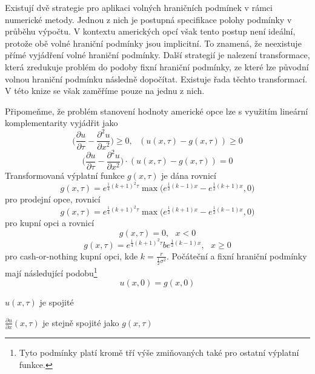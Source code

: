 \documentclass[a4paper]{book}
\begin{document}
Existují dvě strategie pro aplikaci volných hraničních podmínek v rámci numerické metody. Jednou z nich je postupná specifikace polohy podmínky v průběhu výpočtu. V kontextu amerických opcí však tento postup není ideální, protože obě volné hraniční podmínky jsou implicitní. To znamená, že neexistuje přímé vyjádření volné hraniční podmínky. Další strategií je nalezení transformace, která zredukuje problém do podoby fixní hraniční podmínky, ze které lze původní volnou hraniční podmínku následně dopočítat. Existuje řada těchto transformací. V této knize se však zaměříme pouze na jednu z nich.

Připomeňme, že problém stanovení hodnoty americké opce lze s využitím lineární komplementarity vyjádřit jako
\begin{equation*}
\Bigg( \frac{\partial u}{\partial \tau} - \frac{\partial^2 u}{\partial x^2} \Bigg) \ge 0,~~~(u(x, \tau) - g(x,\tau)) \ge 0
\end{equation*}
\begin{equation}
\Bigg( \frac{\partial u}{\partial \tau} - \frac{\partial^2 u}{\partial x^2} \Bigg) \cdot (u(x, \tau) - g(x,\tau)) = 0
\end{equation}
Transformovaná výplatní funkce $g(x, \tau)$ je dána rovnicí
\begin{equation*}
g(x, \tau) = e^{\frac{1}{4}(k+1)^2 \tau}\max\Big( e^{\frac{1}{2}(k-1)x} - e^{\frac{1}{2}(k+1)x}, 0 \Big)
\end{equation*}
pro prodejní opce, rovnicí
\begin{equation*}
g(x, \tau) = e^{\frac{1}{4}(k+1)^2 \tau}\max\Big( e^{\frac{1}{2}(k+1)x} - e^{\frac{1}{2}(k-1)x}, 0 \Big)
\end{equation*}
pro kupní opci a rovnicí
\begin{equation*}
g(x, \tau) = 0, ~~~ x < 0
\end{equation*}
\begin{equation*}
g(x, \tau) = e^{\frac{1}{4}(k+1)^2 \tau}b e^{\frac{1}{2}(k-1)x}, ~~~ x \ge 0
\end{equation*}
pro cash-or-nothing kupní opci, kde $k = \frac{r}{\frac{1}{2}\sigma^2}$. Počáteční a fixní hraniční podmínky mají následující podobu\footnote{Tyto podmínky platí kromě tří výše zmiňovaných také pro ostatní výplatní funkce.}
\begin{equation*}
u(x, 0) = g(x, 0)
\end{equation*}
\begin{center}
$u(x, \tau)$ je spojité
\end{center}
\begin{center}
$\frac{\partial u}{\partial x}(x, \tau)$ je stejně spojité jako $g(x, \tau)$
\end{center}
\end{document}

